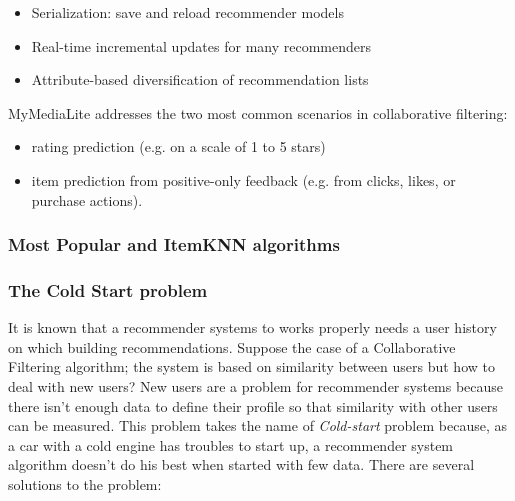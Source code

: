 \documentclass[b5paper,10pt,twoside,cucitura]{toptesi}
\begin{document}
\begin{itemize}
    \item Serialization: save and reload recommender models
    \item Real-time incremental updates for many recommenders
	\item Attribute-based diversification of recommendation lists
\end{itemize}
 
MyMediaLite addresses the two most common scenarios in collaborative filtering:
\begin{itemize}
    \item rating prediction (e.g. on a scale of 1 to 5 stars)
    \item item prediction from positive-only feedback (e.g. from clicks, likes, or purchase actions).
\end{itemize}

\subsubsection{Most Popular and ItemKNN algorithms}


\subsubsection{The Cold Start problem}
It is known that a recommender systems to works properly needs a user history on which building recommendations. Suppose the case of a Collaborative Filtering algorithm; the system is based on similarity between users but how to deal with new users? New users are a problem for recommender systems because there isn't enough data to define their profile so that similarity with other users can be measured. This problem takes the name of \textit{Cold-start} problem because, as a car with a cold engine has troubles to start up, a recommender system algorithm doesn't do his best when started with few data.
There are several solutions to the problem:
\end{document}
